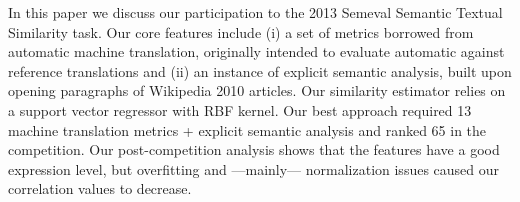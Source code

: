 In this paper we discuss our participation to the 2013 Semeval Semantic Textual Similarity task. Our core features include (i) a set of metrics borrowed from
 automatic machine translation, originally intended to evaluate automatic
 against reference translations and (ii) an instance of explicit semantic
 analysis, built
 upon opening paragraphs of Wikipedia 2010 articles. Our similarity estimator
 relies on a support vector regressor with RBF kernel. Our best approach
 required 13 machine translation metrics + explicit semantic analysis and ranked
 65 in the competition. Our post-competition analysis shows that the features
 have a good expression level, but overfitting and —mainly— normalization
 issues caused
 our correlation values to decrease.

